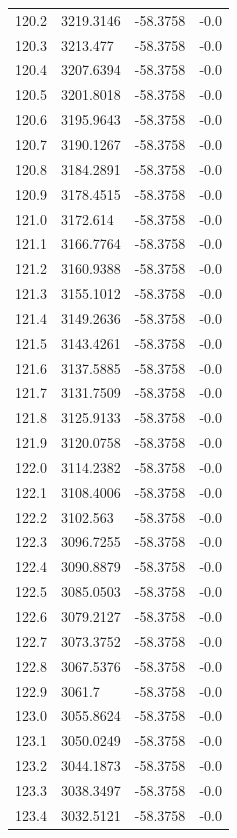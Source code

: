 \begin{table}[H]
\begin{tabular}{llll}
120.2 & 3219.3146 & -58.3758 & -0.0 \\
120.3 & 3213.477 & -58.3758 & -0.0 \\
120.4 & 3207.6394 & -58.3758 & -0.0 \\
120.5 & 3201.8018 & -58.3758 & -0.0 \\
120.6 & 3195.9643 & -58.3758 & -0.0 \\
120.7 & 3190.1267 & -58.3758 & -0.0 \\
120.8 & 3184.2891 & -58.3758 & -0.0 \\
120.9 & 3178.4515 & -58.3758 & -0.0 \\
121.0 & 3172.614 & -58.3758 & -0.0 \\
121.1 & 3166.7764 & -58.3758 & -0.0 \\
121.2 & 3160.9388 & -58.3758 & -0.0 \\
121.3 & 3155.1012 & -58.3758 & -0.0 \\
121.4 & 3149.2636 & -58.3758 & -0.0 \\
121.5 & 3143.4261 & -58.3758 & -0.0 \\
121.6 & 3137.5885 & -58.3758 & -0.0 \\
121.7 & 3131.7509 & -58.3758 & -0.0 \\
121.8 & 3125.9133 & -58.3758 & -0.0 \\
121.9 & 3120.0758 & -58.3758 & -0.0 \\
122.0 & 3114.2382 & -58.3758 & -0.0 \\
122.1 & 3108.4006 & -58.3758 & -0.0 \\
122.2 & 3102.563 & -58.3758 & -0.0 \\
122.3 & 3096.7255 & -58.3758 & -0.0 \\
122.4 & 3090.8879 & -58.3758 & -0.0 \\
122.5 & 3085.0503 & -58.3758 & -0.0 \\
122.6 & 3079.2127 & -58.3758 & -0.0 \\
122.7 & 3073.3752 & -58.3758 & -0.0 \\
122.8 & 3067.5376 & -58.3758 & -0.0 \\
122.9 & 3061.7 & -58.3758 & -0.0 \\
123.0 & 3055.8624 & -58.3758 & -0.0 \\
123.1 & 3050.0249 & -58.3758 & -0.0 \\
123.2 & 3044.1873 & -58.3758 & -0.0 \\
123.3 & 3038.3497 & -58.3758 & -0.0 \\
123.4 & 3032.5121 & -58.3758 & -0.0 \\

\end{tabular}
\end{table}
